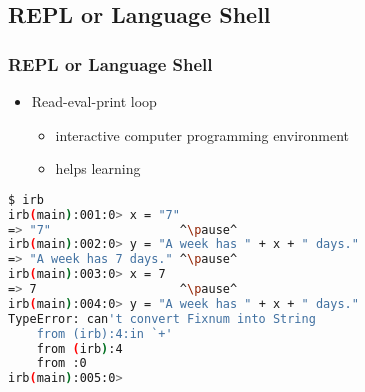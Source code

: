 \subsection{REPL or Language Shell}
\begin{frame}[fragile]\frametitle{REPL or Language Shell}

\begin{itemize}

\item Read-eval-print loop
\begin{itemize}
\item interactive computer programming environment
\item helps learning
\end{itemize}

\end{itemize}
\pause

\begin{lstlisting}[language=bash, escapechar={^}]
$ irb
irb(main):001:0> x = "7"
=> "7"                  ^\pause^
irb(main):002:0> y = "A week has " + x + " days."
=> "A week has 7 days." ^\pause^
irb(main):003:0> x = 7
=> 7                    ^\pause^
irb(main):004:0> y = "A week has " + x + " days."
TypeError: can't convert Fixnum into String
	from (irb):4:in `+'
	from (irb):4
	from :0
irb(main):005:0> 
\end{lstlisting}


\end{frame}





